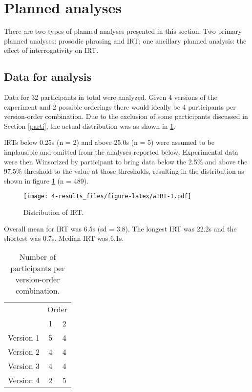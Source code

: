 \documentclass[11pt,oneside]{book}
\begin{document}
\hypertarget{planned-analyses}{%
\section{Planned analyses}\label{planned-analyses}}

There are two types of planned analyses presented in this section. Two primary planned analyses: prosodic phrasing and IRT; one ancillary planned analysis: the effect of interrogativity on IRT.

\hypertarget{data}{%
\subsection{Data for analysis}\label{data}}

Data for 32 participants in total were analyzed. Given 4 versions of the experiment and 2 possible orderings there would ideally be 4 participants per version-order combination. Due to the exclusion of some participants discussed in Section \ref{parti}, the actual distribution was as shown in \ref{tab:vtab}.

IRTs below 0.25s (n = 2) and above 25.0s (n = 5) were assumed to be implausible and omitted from the analyses reported below. Experimental data were then Winsorized by participant to bring data below the 2.5\% and above the 97.5\% threshold to the value at those thresholds, resulting in the distribution as shown in figure \ref{fig:wIRT} (n = 489).

\begin{figure}
\centering
\texttt{[image: 4-results\_files/figure-latex/wIRT-1.pdf]}
\caption{\label{fig:wIRT}Distribution of IRT.}
\end{figure}

Overall mean for IRT was 6.5s (sd = 3.8). The longest IRT was 22.2s and the shortest was 0.7s. Median IRT was 6.1s.

\begin{table}[!h]

\caption{\label{tab:vtab}Number of participants per version-order combination.}
\centering
\begin{tabular}{lcc}
\toprule
\multicolumn{1}{c}{ } & \multicolumn{2}{c}{Order} \\
\cmidrule(l{3pt}r{3pt}){2-3}
  & 1 & 2\\
\midrule
Version 1 & 5 & 4\\
Version 2 & 4 & 4\\
Version 3 & 4 & 4\\
Version 4 & 2 & 5\\
\bottomrule
\end{tabular}
\end{table}
\end{document}
